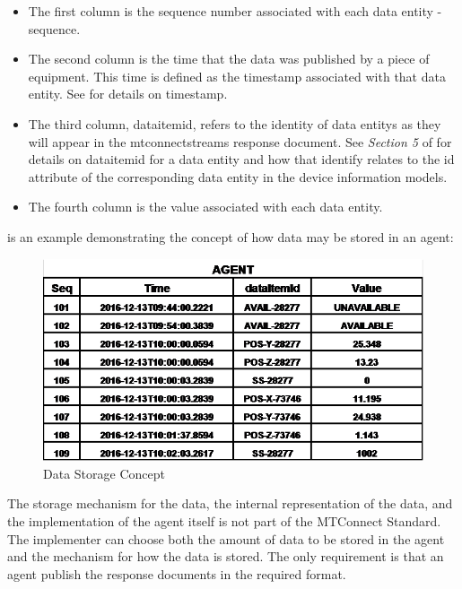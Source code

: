 \begin{itemize}
\item The first column is the \gls{sequence number} associated with each \gls{data entity} - \gls{sequence}.

\item The second column is the time that the data was published by a piece of equipment.  This time is defined as the \gls{timestamp} associated with that \gls{data entity}.  See  for details on \gls{timestamp}.

\item The third column, \gls{dataitemid}, refers to the identity of \glspl{data entity} as they will appear in the \gls{mtconnectstreams response document}.  See \textit{Section 5} of  for details on \gls{dataitemid} for a \gls{data entity} and how that identify relates to the \gls{id} attribute of the corresponding \gls{data entity} in the \glspl{device information model}.

\item The fourth column is the value associated with each \gls{data entity}.
\end{itemize}

 is an example demonstrating the concept of how data may be stored in an \gls{agent}:

\begin{figure}[ht]
  \centering
  \includegraphics[width=1.0\textwidth]{figures/data-storage-concept.png}
  \caption{Data Storage Concept}
  \label{fig:data-storage-concept}
\end{figure}

\FloatBarrier


The storage mechanism for the data, the internal representation of the data, and the implementation of the \gls{agent} itself is not part of the MTConnect Standard.  The implementer can choose both the amount of data to be stored in the \gls{agent} and the mechanism for how the data is stored.  The only requirement is that an \gls{agent} publish the \glspl{response document} in the required format.  

